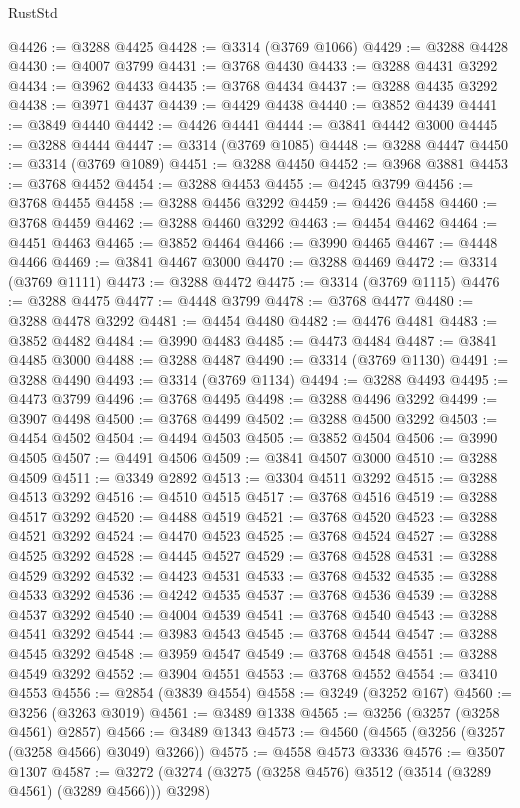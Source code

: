 \begin{lexlean}{RustStd}
\begin{coremodule}
@4426 := @3288 @4425
@4428 := @3314 (@3769 @1066)
@4429 := @3288 @4428
@4430 := @4007 @3799
@4431 := @3768 @4430
@4433 := @3288 @4431 @3292
@4434 := @3962 @4433
@4435 := @3768 @4434
@4437 := @3288 @4435 @3292
@4438 := @3971 @4437
@4439 := @4429 @4438
@4440 := @3852 @4439
@4441 := @3849 @4440
@4442 := @4426 @4441
@4444 := @3841 @4442 @3000
@4445 := @3288 @4444
@4447 := @3314 (@3769 @1085)
@4448 := @3288 @4447
@4450 := @3314 (@3769 @1089)
@4451 := @3288 @4450
@4452 := @3968 @3881
@4453 := @3768 @4452
@4454 := @3288 @4453
@4455 := @4245 @3799
@4456 := @3768 @4455
@4458 := @3288 @4456 @3292
@4459 := @4426 @4458
@4460 := @3768 @4459
@4462 := @3288 @4460 @3292
@4463 := @4454 @4462
@4464 := @4451 @4463
@4465 := @3852 @4464
@4466 := @3990 @4465
@4467 := @4448 @4466
@4469 := @3841 @4467 @3000
@4470 := @3288 @4469
@4472 := @3314 (@3769 @1111)
@4473 := @3288 @4472
@4475 := @3314 (@3769 @1115)
@4476 := @3288 @4475
@4477 := @4448 @3799
@4478 := @3768 @4477
@4480 := @3288 @4478 @3292
@4481 := @4454 @4480
@4482 := @4476 @4481
@4483 := @3852 @4482
@4484 := @3990 @4483
@4485 := @4473 @4484
@4487 := @3841 @4485 @3000
@4488 := @3288 @4487
@4490 := @3314 (@3769 @1130)
@4491 := @3288 @4490
@4493 := @3314 (@3769 @1134)
@4494 := @3288 @4493
@4495 := @4473 @3799
@4496 := @3768 @4495
@4498 := @3288 @4496 @3292
@4499 := @3907 @4498
@4500 := @3768 @4499
@4502 := @3288 @4500 @3292
@4503 := @4454 @4502
@4504 := @4494 @4503
@4505 := @3852 @4504
@4506 := @3990 @4505
@4507 := @4491 @4506
@4509 := @3841 @4507 @3000
@4510 := @3288 @4509
@4511 := @3349 @2892
@4513 := @3304 @4511 @3292
@4515 := @3288 @4513 @3292
@4516 := @4510 @4515
@4517 := @3768 @4516
@4519 := @3288 @4517 @3292
@4520 := @4488 @4519
@4521 := @3768 @4520
@4523 := @3288 @4521 @3292
@4524 := @4470 @4523
@4525 := @3768 @4524
@4527 := @3288 @4525 @3292
@4528 := @4445 @4527
@4529 := @3768 @4528
@4531 := @3288 @4529 @3292
@4532 := @4423 @4531
@4533 := @3768 @4532
@4535 := @3288 @4533 @3292
@4536 := @4242 @4535
@4537 := @3768 @4536
@4539 := @3288 @4537 @3292
@4540 := @4004 @4539
@4541 := @3768 @4540
@4543 := @3288 @4541 @3292
@4544 := @3983 @4543
@4545 := @3768 @4544
@4547 := @3288 @4545 @3292
@4548 := @3959 @4547
@4549 := @3768 @4548
@4551 := @3288 @4549 @3292
@4552 := @3904 @4551
@4553 := @3768 @4552
@4554 := @3410 @4553
@4556 := @2854 (@3839 @4554)
@4558 := @3249 (@3252 @167)
@4560 := @3256 (@3263 @3019)
@4561 := @3489 @1338
@4565 := @3256 (@3257 (@3258 @4561) @2857)
@4566 := @3489 @1343
@4573 := @4560 (@4565 (@3256 (@3257 (@3258 @4566) @3049) @3266))
@4575 := @4558 @4573 @3336
@4576 := @3507 @1307
@4587 := @3272 (@3274 (@3275 (@3258 @4576) @3512 (@3514 (@3289 @4561) (@3289 @4566))) @3298)

\end{coremodule}
\end{lexlean}
